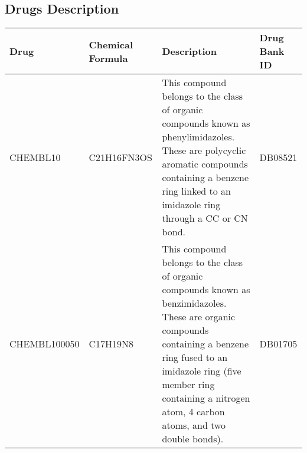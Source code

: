 \begin{landscape}
\begin{table}[H]
\begin{longtable}{|p{1.5cm}|p{3.7cm}|p{18cm}|}
        \end{longtable}
    
\end{table}
\end{landscape}
\begin{landscape}
\section{Drugs Description}

\begin{table}[H]
    \centering
    \caption{Description of Drug Compounds.}
    \begin{longtable}{|p{3.0cm}|p{3.7cm}|p{7cm}|p{1.5cm}|}
    \hline
    
    Drug & Chemical Formula & Description  & Drug Bank ID \\ \hline
    CHEMBL10 & C21H16FN3OS & This compound belongs to the class of organic compounds known as phenylimidazoles. These are polycyclic aromatic compounds containing a benzene ring linked to an imidazole ring through a CC or CN bond. & DB08521 \\ \hline
    CHEMBL100050 & C17H19N8 & This compound belongs to the class of organic compounds known as benzimidazoles. These are organic compounds containing a benzene ring fused to an imidazole ring (five member ring containing a nitrogen atom, 4 carbon atoms, and two double bonds). & DB01705 \\ \hline
    
    \end{longtable}
\end{table}
\end{landscape}